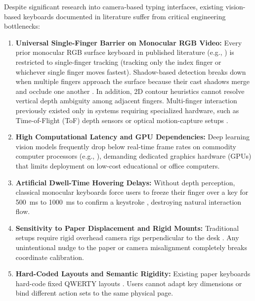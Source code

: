 \documentclass[conference]{IEEEtran}
\begin{document}
Despite significant research into camera-based typing interfaces, existing vision-based keyboards documented in literature suffer from critical engineering bottlenecks:
\begin{enumerate}
    \item \textbf{Universal Single-Finger Barrier on Monocular RGB Video:} Every prior monocular RGB surface keyboard in published literature (e.g., \cite{Thomas2013Camera, Posner2012Single, Yue2014Blind, Srivastava2012RealTime, Khare2019QWERTY, Ji2018Local}) is restricted to single-finger tracking (tracking only the index finger or whichever single finger moves fastest). Shadow-based detection breaks down when multiple fingers approach the surface because their cast shadows merge and occlude one another \cite{Thomas2013Camera}. In addition, 2D contour heuristics cannot resolve vertical depth ambiguity among adjacent fingers. Multi-finger interaction previously existed only in systems requiring specialized hardware, such as Time-of-Flight (ToF) depth sensors \cite{Lee2019Virtual, Toshpulatov2024RealTime, Kudale2016RealTime, Lee2022Virtual} or optical motion-capture setups \cite{Pilkov2024Markerless, MacRitchie2015Integrating}.
    \item \textbf{High Computational Latency and GPU Dependencies:} Deep learning vision models frequently drop below real-time frame rates on commodity computer processors (e.g., \cite{Enkhbat2020HandKey, Ji2018Local}), demanding dedicated graphics hardware (GPUs) that limits deployment on low-cost educational or office computers.
    \item \textbf{Artificial Dwell-Time Hovering Delays:} Without depth perception, classical monocular keyboards force users to freeze their finger over a key for 500~ms to 1000~ms to confirm a keystroke \cite{Khare2019QWERTY, Chen2024Gaze}, destroying natural interaction flow.
    \item \textbf{Sensitivity to Paper Displacement and Rigid Mounts:} Traditional setups require rigid overhead camera rigs perpendicular to the desk \cite{Zhang2001Visual}. Any unintentional nudge to the paper or camera misalignment completely breaks coordinate calibration.
    \item \textbf{Hard-Coded Layouts and Semantic Rigidity:} Existing paper keyboards hard-code fixed QWERTY layouts \cite{Zhang2001Visual, Srivastava2012RealTime}. Users cannot adapt key dimensions or bind different action sets to the same physical page.
\end{enumerate}
\end{document}
